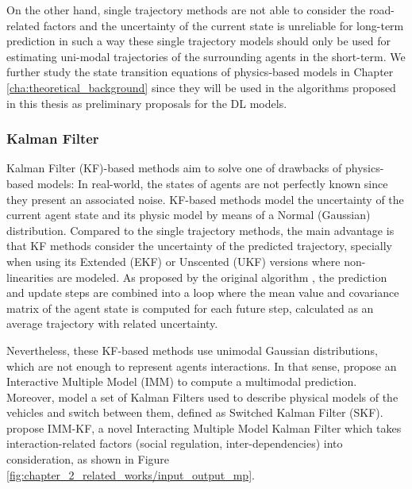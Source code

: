 
On the other hand, single trajectory methods are not able to consider the road-related factors and the uncertainty of the current state is unreliable for long-term prediction in such a way these single trajectory models should only be used for estimating uni-modal trajectories of the surrounding agents in the short-term. We further study the state transition equations of physics-based models in Chapter \ref{cha:theoretical_background} since they will be used in the algorithms proposed in this thesis as preliminary proposals for the \ac{DL} models.

\subsubsection{Kalman Filter}
\label{subsubsec:2_kalman_filter_mp}

Kalman Filter (KF)-based methods aim to solve one of drawbacks of physics-based models: In real-world, the states of agents are not perfectly known since they present an associated noise. KF-based methods model the uncertainty of the current agent state and its physic model by means of a Normal (Gaussian) distribution. Compared to the single trajectory methods, the main advantage is that KF methods consider the uncertainty of the predicted trajectory, specially when using its Extended (EKF) or Unscented (UKF) versions where non-linearities are modeled. As proposed by the original algorithm \cite{kalman1960new}, the prediction and update steps are combined into a loop where the mean value and covariance matrix of the agent state is computed for each future step, calculated as an average trajectory with related uncertainty. 

Nevertheless, these KF-based methods use unimodal Gaussian distributions, which are not enough to represent agents interactions. In that sense, \cite{kaempchen2004imm} propose an Interactive Multiple Model (IMM) to compute a multimodal prediction. Moreover, \cite{jin2015switched} model a set of Kalman Filters used to describe physical models of the vehicles and switch between them, defined as Switched Kalman Filter (SKF). \cite{lefkopoulos2020interaction} propose IMM-KF, a novel Interacting Multiple Model Kalman Filter which takes interaction-related factors (social regulation, inter-dependencies) into consideration, as shown in Figure \ref{fig:chapter_2_related_works/input_output_mp}.

